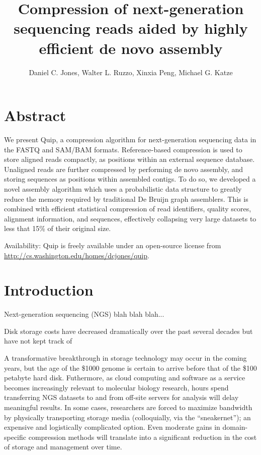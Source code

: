 \documentclass[twocolumn]{article}
\title{Compression of next-generation sequencing reads aided by highly efficient de novo assembly}
\author{Daniel C. Jones, Walter L. Ruzzo, Xinxia Peng, Michael G. Katze}
\begin{document}
\maketitle

\section{Abstract}

We present Quip, a compression algorithm for next-generation sequencing data
in the FASTQ and SAM/BAM formats. Reference-based compression is used to store
aligned reads compactly, as positions within an external sequence database.
Unaligned reads are further compressed by performing de novo assembly, and
storing sequences as positions within assembled contigs. To do so, we
developed a novel assembly algorithm which uses a probabilistic data structure
to greatly reduce the memory required by traditional De Bruijn graph
assemblers. This is combined with efficient statistical compression of read
identifiers, quality scores, alignment information, and sequences, effectively
collapsing very large datasets to less that 15\% of their original size.

Availability: Quip is freely available under an open-source license from
\url{http://cs.washington.edu/homes/dcjones/quip}.

\section{Introduction}

Next-generation sequencing (NGS) blah blah blah...

Disk storage costs have decreased dramatically over the past several decades
but have not kept track of 

A transformative breakthrough in storage technology may occur in the coming
years, but the age of the \$1000 genome is certain to arrive before that of
the \$100 petabyte hard disk. Futhermore, as cloud computing and software as a
service becomes increasingly relevant to molecular biology research, hours
spend transferring NGS datasets to and from off-site servers for analysis will
delay meaningful results. In some cases, researchers are forced to maximize
bandwidth by physically transporting storage media (colloquially, via the
``sneakernet''); an expensive and logistically complicated option. Even
moderate gains in domain-specific compression methods will translate into a
significant reduction in the cost of storage and management over time.
\end{document}
